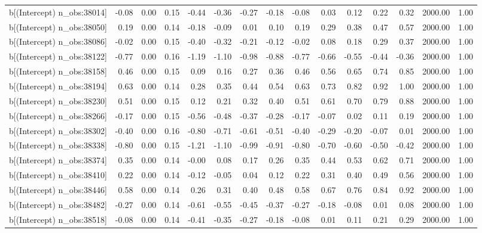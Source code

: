 \begin{table}[ht]
\begin{tabular}{rrrrrrrrrrrrrrr}
  b[(Intercept) n\_obs:38014] & -0.08 & 0.00 & 0.15 & -0.44 & -0.36 & -0.27 & -0.18 & -0.08 & 0.03 & 0.12 & 0.22 & 0.32 & 2000.00 & 1.00 \\ 
  b[(Intercept) n\_obs:38050] & 0.19 & 0.00 & 0.14 & -0.18 & -0.09 & 0.01 & 0.10 & 0.19 & 0.29 & 0.38 & 0.47 & 0.57 & 2000.00 & 1.00 \\ 
  b[(Intercept) n\_obs:38086] & -0.02 & 0.00 & 0.15 & -0.40 & -0.32 & -0.21 & -0.12 & -0.02 & 0.08 & 0.18 & 0.29 & 0.37 & 2000.00 & 1.00 \\ 
  b[(Intercept) n\_obs:38122] & -0.77 & 0.00 & 0.16 & -1.19 & -1.10 & -0.98 & -0.88 & -0.77 & -0.66 & -0.55 & -0.44 & -0.36 & 2000.00 & 1.00 \\ 
  b[(Intercept) n\_obs:38158] & 0.46 & 0.00 & 0.15 & 0.09 & 0.16 & 0.27 & 0.36 & 0.46 & 0.56 & 0.65 & 0.74 & 0.85 & 2000.00 & 1.00 \\ 
  b[(Intercept) n\_obs:38194] & 0.63 & 0.00 & 0.14 & 0.28 & 0.35 & 0.44 & 0.54 & 0.63 & 0.73 & 0.82 & 0.92 & 1.00 & 2000.00 & 1.00 \\ 
  b[(Intercept) n\_obs:38230] & 0.51 & 0.00 & 0.15 & 0.12 & 0.21 & 0.32 & 0.40 & 0.51 & 0.61 & 0.70 & 0.79 & 0.88 & 2000.00 & 1.00 \\ 
  b[(Intercept) n\_obs:38266] & -0.17 & 0.00 & 0.15 & -0.56 & -0.48 & -0.37 & -0.28 & -0.17 & -0.07 & 0.02 & 0.11 & 0.19 & 2000.00 & 1.00 \\ 
  b[(Intercept) n\_obs:38302] & -0.40 & 0.00 & 0.16 & -0.80 & -0.71 & -0.61 & -0.51 & -0.40 & -0.29 & -0.20 & -0.07 & 0.01 & 2000.00 & 1.00 \\ 
  b[(Intercept) n\_obs:38338] & -0.80 & 0.00 & 0.15 & -1.21 & -1.10 & -0.99 & -0.91 & -0.80 & -0.70 & -0.60 & -0.50 & -0.42 & 2000.00 & 1.00 \\ 
  b[(Intercept) n\_obs:38374] & 0.35 & 0.00 & 0.14 & -0.00 & 0.08 & 0.17 & 0.26 & 0.35 & 0.44 & 0.53 & 0.62 & 0.71 & 2000.00 & 1.00 \\ 
  b[(Intercept) n\_obs:38410] & 0.22 & 0.00 & 0.14 & -0.12 & -0.05 & 0.04 & 0.12 & 0.22 & 0.31 & 0.40 & 0.49 & 0.56 & 2000.00 & 1.00 \\ 
  b[(Intercept) n\_obs:38446] & 0.58 & 0.00 & 0.14 & 0.26 & 0.31 & 0.40 & 0.48 & 0.58 & 0.67 & 0.76 & 0.84 & 0.92 & 2000.00 & 1.00 \\ 
  b[(Intercept) n\_obs:38482] & -0.27 & 0.00 & 0.14 & -0.61 & -0.55 & -0.45 & -0.37 & -0.27 & -0.18 & -0.08 & 0.01 & 0.08 & 2000.00 & 1.00 \\ 
  b[(Intercept) n\_obs:38518] & -0.08 & 0.00 & 0.14 & -0.41 & -0.35 & -0.27 & -0.18 & -0.08 & 0.01 & 0.11 & 0.21 & 0.29 & 2000.00 & 1.00 \\ 

\end{tabular}
\end{table}
